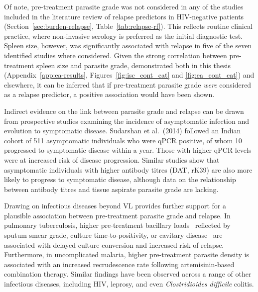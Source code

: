 Of note, pre-treatment parasite grade was not considered in any of the studies included in the literature review of relapse predictors in HIV-negative patients (Section~\ref{sec:burden-relapse}, Table~\ref{tab:relapse-rf}). This reflects routine clinical practice, where non-invasive serology is preferred as the initial diagnostic test. Spleen size, however, was significantly associated with relapse in five of the seven identified studies where considered\cite{sundar2019,burza2014,lucero2015,gorski2010,kajaia2011}. Given the strong correlation between pre-treatment spleen size and parasite grade, demonstrated both in this thesis (Appendix~\ref{app:ea-results}, Figures~\ref{fig:isc_cont_cat} and \ref{fig:ea_cont_cat}) and elsewhere\cite{kumar2018}, it can be inferred that if pre-treatment parasite grade \textit{were} considered as a relapse predictor, a positive association would have been shown.

Indirect evidence on the link between parasite grade and relapse can be drawn from prospective studies examining the incidence of asymptomatic infection and evolution to symptomatic disease. Sudarshan et al.\ (2014) followed an Indian cohort of 511 asymptomatic individuals who were qPCR positive, of whom 10 progressed to symptomatic disease within a year. Those with higher qPCR levels were at increased risk of disease progression\cite{sudarshan2014}. Similar studies show that asymptomatic individuals with higher antibody titres (DAT, rK39) are also more likely to progress to symptomatic disease\cite{hasker2014,chapman2015}, although data on the relationship between antibody titres and tissue aspirate parasite grade are lacking.

Drawing on infectious diseases beyond VL provides further support for a plausible association between pre-treatment parasite grade and relapse. In pulmonary tuberculosis, higher pre-treatment bacillary loads \textemdash\ reflected by sputum smear grade, culture time-to-positivity, or cavitary disease \textemdash\ are associated with delayed culture conversion and increased risk of relapse\cite{bark2012,hesseling2010}. Furthermore, in uncomplicated malaria, higher pre-treatment parasite density is associated with an increased recrudescence rate following artemisinin-based combination therapy\cite{white2009,WWARN2015}. Similar findings have been observed across a range of other infectious diseases, including HIV\cite{ICONA2019}, leprosy\cite{balagon2009}, and even \textit{Clostridioides difficile} colitis\cite{alonso2022}.

